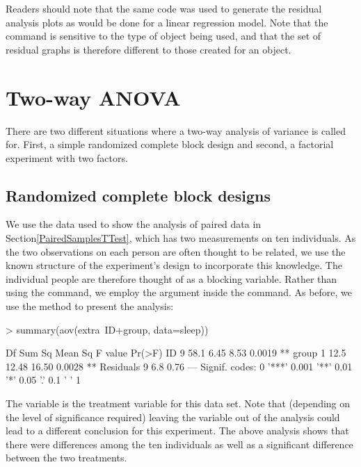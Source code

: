 Readers should note that the same code was used to generate the residual analysis plots as would be done for a linear regression model. Note that the  command is sensitive to the type of object being used, and that the set of residual graphs is therefore different to those created for an  object.

\section{Two-way ANOVA}

There are two different situations where a two-way analysis of variance is called for. First, a simple randomized complete block design and second, a factorial experiment with two factors.

\subsection{Randomized complete block designs}
\label{RCBAnalysis}

We use the  data used to show the analysis of paired data in Section\ref{PairedSamplesTTest}, which has two measurements on ten individuals. As the two observations on each person are often thought to be related, we use the known structure of the experiment's design to incorporate this knowledge. The individual people are therefore thought of as a blocking variable. Rather than using the  command, we employ the  argument inside the  command. As before, we use the  method to present the analysis:
\begin{Schunk}
\begin{Sinput}
> summary(aov(extra~ID+group, data=sleep))
\end{Sinput}
\begin{Soutput}
            Df Sum Sq Mean Sq F value Pr(>F)   
ID           9   58.1    6.45    8.53 0.0019 **
group        1   12.5   12.48   16.50 0.0028 **
Residuals    9    6.8    0.76                  
---
Signif. codes:  
0 '***' 0.001 '**' 0.01 '*' 0.05 '.' 0.1 ' ' 1
\end{Soutput}
\end{Schunk}

The  variable is the treatment variable for this data set. Note that (depending on the level of significance required) leaving the  variable out of the analysis could lead to a different conclusion for this experiment. The above analysis shows that there were differences among the ten individuals as well as a significant difference between the two treatments.


